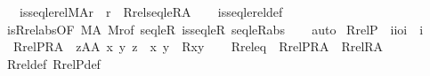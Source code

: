 \begin{isabellebody}
\ \ \ {\isachardoublequoteopen}is{\isacharunderscore}{\kern0pt}seqlerel{\isacharparenleft}{\kern0pt}M{\isacharcomma}{\kern0pt}A{\isacharcomma}{\kern0pt}r{\isacharparenright}{\kern0pt}\ {\isasymlongleftrightarrow}\ r\ {\isacharequal}{\kern0pt}\ Rrel{\isacharparenleft}{\kern0pt}seqleR{\isacharcomma}{\kern0pt}A{\isacharparenright}{\kern0pt}{\isachardoublequoteclose}\isanewline
%
\isadelimproof
\ \ %
\endisadelimproof
%
\isatagproof
{}\isamarkupfalse%
\ is{\isacharunderscore}{\kern0pt}seqlerel{\isacharunderscore}{\kern0pt}def\isanewline
\ \ \isamarkupfalse%
\ is{\isacharunderscore}{\kern0pt}Rrel{\isacharunderscore}{\kern0pt}abs{\isacharbrackleft}{\kern0pt}OF\ {\isacartoucheopen}M{\isacharparenleft}{\kern0pt}A{\isacharparenright}{\kern0pt}{\isacartoucheclose}\ {\isacartoucheopen}M{\isacharparenleft}{\kern0pt}r{\isacharparenright}{\kern0pt}{\isacartoucheclose}{\isacharcomma}{\kern0pt}of\ seqleR\ is{\isacharunderscore}{\kern0pt}seqleR{\isacharbrackright}{\kern0pt}\ seqleR{\isacharunderscore}{\kern0pt}abs\isanewline
\ \ \isamarkupfalse%
\ auto%
\endisatagproof
{\isafoldproof}%
%
\isadelimproof
\isanewline
%
\endisadelimproof
\isanewline
{}\isamarkupfalse%
\ RrelP\ {\isacharcolon}{\kern0pt}{\isacharcolon}{\kern0pt}\ {\isachardoublequoteopen}{\isacharbrackleft}{\kern0pt}i{\isasymRightarrow}i{\isasymRightarrow}o{\isacharcomma}{\kern0pt}i{\isacharbrackright}{\kern0pt}\ {\isasymRightarrow}\ i{\isachardoublequoteclose}\ \isanewline
\ \ {\isachardoublequoteopen}RrelP{\isacharparenleft}{\kern0pt}R{\isacharcomma}{\kern0pt}A{\isacharparenright}{\kern0pt}\ {\isasymequiv}\ {\isacharbraceleft}{\kern0pt}z{\isasymin}A{\isasymtimes}A{\isachardot}{\kern0pt}\ {\isasymexists}x\ y{\isachardot}{\kern0pt}\ z\ {\isacharequal}{\kern0pt}\ {\isasymlangle}x{\isacharcomma}{\kern0pt}\ y{\isasymrangle}\ {\isasymand}\ R{\isacharparenleft}{\kern0pt}x{\isacharcomma}{\kern0pt}y{\isacharparenright}{\kern0pt}{\isacharbraceright}{\kern0pt}{\isachardoublequoteclose}\isanewline
\ \ \isanewline
{}\isamarkupfalse%
\ Rrel{\isacharunderscore}{\kern0pt}eq\ {\isacharcolon}{\kern0pt}\ {\isachardoublequoteopen}RrelP{\isacharparenleft}{\kern0pt}R{\isacharcomma}{\kern0pt}A{\isacharparenright}{\kern0pt}\ {\isacharequal}{\kern0pt}\ Rrel{\isacharparenleft}{\kern0pt}R{\isacharcomma}{\kern0pt}A{\isacharparenright}{\kern0pt}{\isachardoublequoteclose}\isanewline
%
\isadelimproof
\ \ %
\endisadelimproof
%
\isatagproof
{}\isamarkupfalse%
\ Rrel{\isacharunderscore}{\kern0pt}def\ RrelP{\isacharunderscore}{\kern0pt}def\ \isamarkupfalse%

\end{isabellebody}
